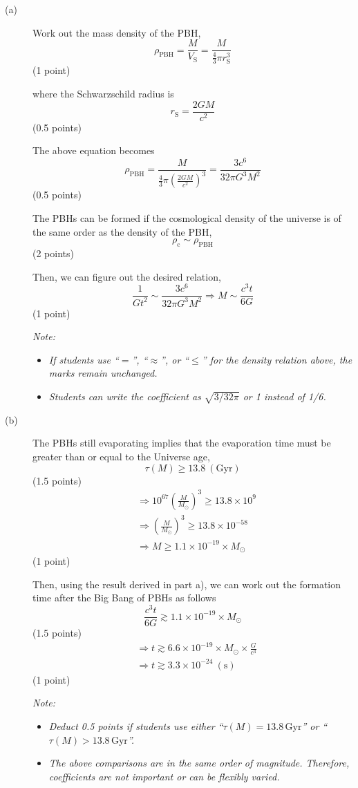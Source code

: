 \begin{description}
\item[(a)] Work out the mass density of the PBH,
  \[ \rho_{\mathrm{PBH}} = \frac{M}{V_{\mathrm{S}}}
     = \frac{M}{\frac{4}{3}\pi r_{\mathrm{S}}^3} \]
  \hfill(1 point)

  where the Schwarzschild radius is
  \[ r_{\mathrm{S}} = \frac{2GM}{c^2} \]
  \hfill(0.5 points)

  The above equation becomes
  \[ \rho_{\mathrm{PBH}}
     = \frac{M}{\frac{4}{3}\pi\left(\frac{2GM}{c^2}\right)^3}
     = \frac{3c^6}{32\pi G^3 M^2} \]
  \hfill(0.5 points)

  The PBHs can be formed if the cosmological density of the universe is of
  the same order as the density of the PBH,
  \[ \rho_{\mathrm{c}} \sim \rho_{\mathrm{PBH}} \]
  \hfill(2 points)

  Then, we can figure out the desired relation,
  \[ \frac{1}{Gt^2} \sim \frac{3c^6}{32\pi G^3 M^2}
     \Rightarrow M \sim \frac{c^3 t}{6G} \]
  \hfill(1 point)

  \textit{Note:}
  \begin{itemize}
  \item \textit{If students use ``$=$'', ``$\approx$'', or ``$\le$'' for the
    density relation above, the marks remain unchanged.}
  \item \textit{Students can write the coefficient as $\sqrt{3/32\pi}$ or 1
    instead of 1/6.}
  \end{itemize}

\item[(b)] The PBHs still evaporating implies that the evaporation time must
  be greater than or equal to the Universe age,
  \[ \tau(M) \ge 13.8\ \mathrm{(Gyr)} \]
  \hfill(1.5 points)
  \begin{align*}
    &\Rightarrow 10^{67}\left(\frac{M}{M_\odot}\right)^3 \ge 13.8 \times 10^9 \\
    &\Rightarrow \left(\frac{M}{M_\odot}\right)^3 \ge 13.8 \times 10^{-58} \\
    &\Rightarrow M \ge 1.1 \times 10^{-19} \times M_\odot
  \end{align*}
  \hfill(1 point)

  Then, using the result derived in part a), we can work out the formation
  time after the Big Bang of PBHs as follows
  \[ \frac{c^3 t}{6G} \gtrsim 1.1 \times 10^{-19} \times M_\odot \]
  \hfill(1.5 points)
  \begin{align*}
    &\Rightarrow t \gtrsim 6.6 \times 10^{-19} \times M_\odot \times \frac{G}{c^3} \\
    &\Rightarrow t \gtrsim 3.3 \times 10^{-24}\ \mathrm{(s)}
  \end{align*}
  \hfill(1 point)

  \textit{Note:}
  \begin{itemize}
  \item \textit{Deduct 0.5 points if students use either
    ``$\tau(M) = 13.8\,\mathrm{Gyr}$'' or ``$\tau(M) > 13.8\,\mathrm{Gyr}$''.}
  \item \textit{The above comparisons are in the same order of magnitude.
    Therefore, coefficients are not important or can be flexibly varied.}
  \end{itemize}
\end{description}

